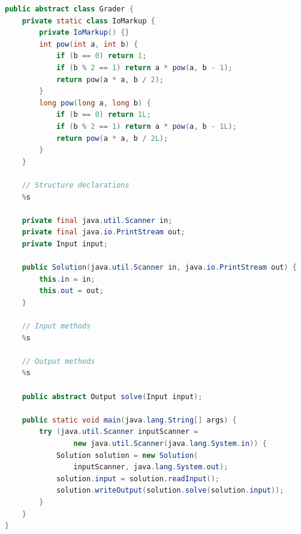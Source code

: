 \documentclass[times,specification,annotation]{style/itmo-student-thesis/itmo-student-thesis}
\begin{document}
\begin{lstlisting}[caption={Шаблон исходного кода грейдера на языке Java},label={templates-grader-java},language=Java]
public abstract class Grader {
    private static class IoMarkup {
        private IoMarkup() {}
        int pow(int a, int b) {
            if (b == 0) return 1;
            if (b % 2 == 1) return a * pow(a, b - 1);
            return pow(a * a, b / 2);
        }
        long pow(long a, long b) {
            if (b == 0) return 1L;
            if (b % 2 == 1) return a * pow(a, b - 1L);
            return pow(a * a, b / 2L);
        }
    }

    // Structure declarations
    %s

    private final java.util.Scanner in;
    private final java.io.PrintStream out;
    private Input input;

    public Solution(java.util.Scanner in, java.io.PrintStream out) {
        this.in = in;
        this.out = out;
    }

    // Input methods
    %s
    
    // Output methods
    %s

    public abstract Output solve(Input input);

    public static void main(java.lang.String[] args) {
        try (java.util.Scanner inputScanner =
                new java.util.Scanner(java.lang.System.in)) {
            Solution solution = new Solution(
                inputScanner, java.lang.System.out);
            solution.input = solution.readInput();
            solution.writeOutput(solution.solve(solution.input));
        }
    }
}
\end{lstlisting}
\end{document}
